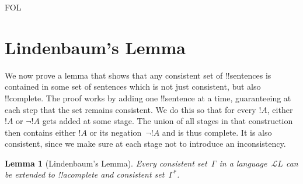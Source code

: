 \documentclass[10pt,a4paper]{article}
\theoremstyle{plain}
\newtheorem{lem}[thm]{Lemma}
\theoremstyle{definition}
\theoremstyle{remark}
\newenvironment{explain}{}{}
\newcommand*{\olfileid}[3]{}
\newcommand*{\olsection}[1]{\section*{#1}}
\newcommand*{\ollabel}[1]{\label{#1}}
\providecommand{\Lang}{\ensuremath{\mathcal{L}}}
\providecommand{\iftag}[1]{#1}
\begin{document}



\iftag{FOL}
      {\olfileid{fol}{com}{lin}}
      {\olfileid{pl}{com}{lin}}

\olsection{Lindenbaum's Lemma}

\begin{explain}
We now prove a lemma that shows that any consistent set of
!!{sentence}s is contained in some set of sentences which is not just
consistent, but also !!{complete}. The proof works by adding one
!!{sentence} at a time, guaranteeing at each step that the set remains
consistent. We do this so that for every $!A$, either $!A$ or $\lnot
!A$ gets added at some stage. The union of all stages in that
construction then contains either $!A$ or its negation~$\lnot !A$ and
is thus complete. It is also consistent, since we make sure at each
stage not to introduce an inconsistency.
\end{explain}

\begin{lem}[Lindenbaum's Lemma]
\ollabel{lem:lindenbaum} Every consistent
set~$\Gamma$ in a language~$\Lang{L}$ can be
extended to !!a{complete} and consistent set~$\Gamma^*$.
\end{lem}
\end{document}
